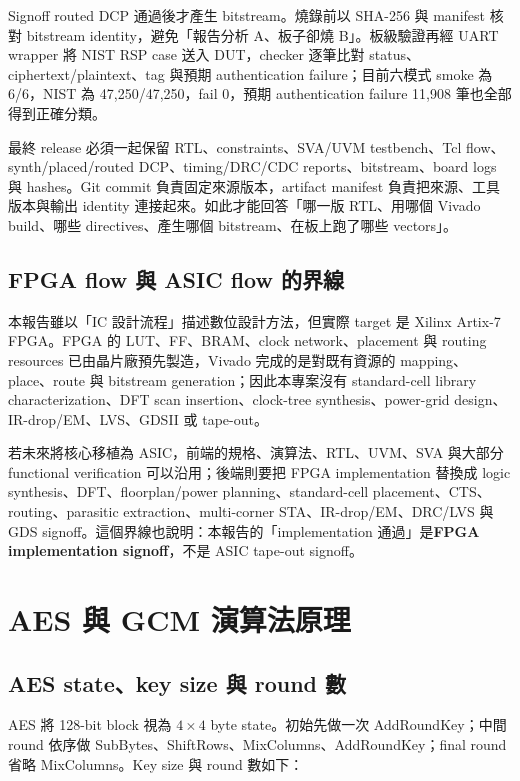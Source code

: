 \documentclass[UTF8,fontset=none,11pt,a4paper]{ctexrep}
\begin{document}
Signoff routed DCP 通過後才產生 bitstream。燒錄前以 SHA-256 與 manifest 核對 bitstream identity，避免「報告分析 A、板子卻燒 B」。板級驗證再經 UART wrapper 將 NIST RSP case 送入 DUT，checker 逐筆比對 status、ciphertext/plaintext、tag 與預期 authentication failure；目前六模式 smoke 為 6/6，NIST 為 47,250/47,250，fail 0，預期 authentication failure 11,908 筆也全部得到正確分類。

最終 release 必須一起保留 RTL、constraints、SVA/UVM testbench、Tcl flow、synth/placed/routed DCP、timing/DRC/CDC reports、bitstream、board logs 與 hashes。Git commit 負責固定來源版本，artifact manifest 負責把來源、工具版本與輸出 identity 連接起來。如此才能回答「哪一版 RTL、用哪個 Vivado build、哪些 directives、產生哪個 bitstream、在板上跑了哪些 vectors」。

\section{FPGA flow 與 ASIC flow 的界線}

本報告雖以「IC 設計流程」描述數位設計方法，但實際 target 是 Xilinx Artix-7 FPGA。FPGA 的 LUT、FF、BRAM、clock network、placement 與 routing resources 已由晶片廠預先製造，Vivado 完成的是對既有資源的 mapping、place、route 與 bitstream generation；因此本專案沒有 standard-cell library characterization、DFT scan insertion、clock-tree synthesis、power-grid design、IR-drop/EM、LVS、GDSII 或 tape-out。

若未來將核心移植為 ASIC，前端的規格、演算法、RTL、UVM、SVA 與大部分 functional verification 可以沿用；後端則要把 FPGA implementation 替換成 logic synthesis、DFT、floorplan/power planning、standard-cell placement、CTS、routing、parasitic extraction、multi-corner STA、IR-drop/EM、DRC/LVS 與 GDS signoff。這個界線也說明：本報告的「implementation 通過」是\textbf{FPGA implementation signoff}，不是 ASIC tape-out signoff。

\chapter{AES 與 GCM 演算法原理}

\section{AES state、key size 與 round 數}

AES 將 128-bit block 視為 $4\times 4$ byte state。初始先做一次 AddRoundKey；中間 round 依序做 SubBytes、ShiftRows、MixColumns、AddRoundKey；final round 省略 MixColumns。Key size 與 round 數如下：
\end{document}
